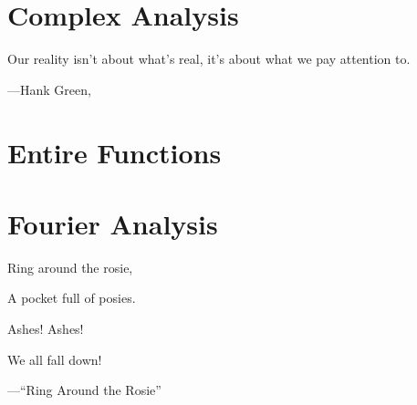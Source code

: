 \documentclass[openany]{book}
\begin{document}
\chapter{Complex Analysis}

\epigraph{Our reality isn't about what's real, it's about what we pay attention to.}
{---Hank Green, \cite{beautiful-endeavor}}



\chapter{Entire Functions}



\chapter{Fourier Analysis}
\epigraph{Ring around the rosie,

A pocket full of posies.

Ashes! Ashes!

We all fall down!}{---``Ring Around the Rosie''}



\nirprintbib
\nirprintindex
\end{document}
